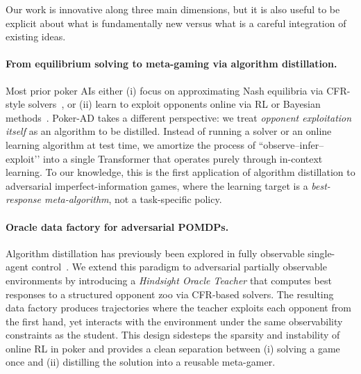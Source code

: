 \documentclass{article}
\begin{document}
Our work is innovative along three main dimensions, but it is also useful to be explicit about what is fundamentally new versus what is a careful integration of existing ideas.

\paragraph{From equilibrium solving to meta-gaming via algorithm distillation.}
Most prior poker AIs either (i) focus on approximating Nash equilibria via CFR-style solvers~\citep{moravcik2017deepstack,brown2019superhuman,brown2019deepcfr}, or (ii) learn to exploit opponents online via RL or Bayesian methods~\citep{southey2005bayesbluff,heinrich2016nfsp,ganzfried2018bayesian,nashed2022opponentSurvey}. Poker-AD takes a different perspective: we treat \emph{opponent exploitation itself} as an algorithm to be distilled. Instead of running a solver or an online learning algorithm at test time, we amortize the process of ``observe–infer–exploit’’ into a single Transformer that operates purely through in-context learning. To our knowledge, this is the first application of algorithm distillation to adversarial imperfect-information games, where the learning target is a \emph{best-response meta-algorithm}, not a task-specific policy.

\paragraph{Oracle data factory for adversarial POMDPs.}
Algorithm distillation has previously been explored in fully observable single-agent control~\citep{laskin2023context,chen2021decisiontransformer}. We extend this paradigm to adversarial partially observable environments by introducing a \emph{Hindsight Oracle Teacher} that computes best responses to a structured opponent zoo via CFR-based solvers. The resulting data factory produces trajectories where the teacher exploits each opponent from the first hand, yet interacts with the environment under the same observability constraints as the student. This design sidesteps the sparsity and instability of online RL in poker and provides a clean separation between (i) solving a game once and (ii) distilling the solution into a reusable meta-gamer.
\end{document}

